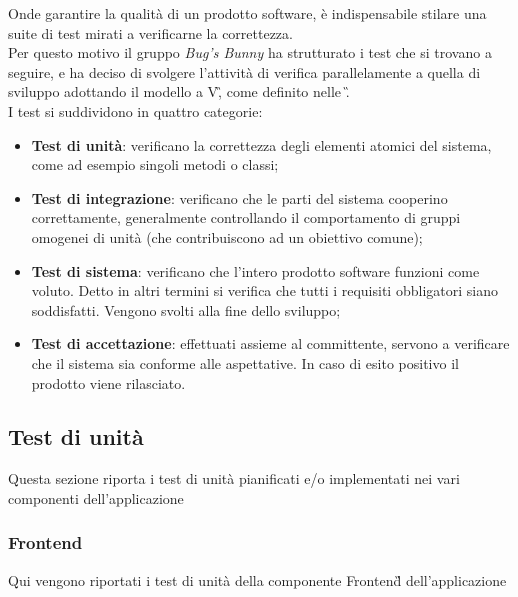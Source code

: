 
Onde garantire la qualità di un prodotto software, è indispensabile stilare una suite di test
mirati a verificarne la correttezza. \\
Per questo motivo il gruppo \textit{Bug's Bunny} ha strutturato i test che si trovano a seguire, e ha deciso 
di svolgere l'attività di verifica parallelamente a quella di sviluppo adottando il modello a V\G, 
come definito nelle \NdP\G. \\
I test si suddividono in quattro categorie:

\begin{itemize}
	\item \textbf{Test di unità}:  verificano la correttezza degli elementi atomici del sistema, come ad esempio singoli metodi o classi;
	\item \textbf{Test di integrazione}: verificano che le parti del sistema cooperino correttamente, generalmente controllando il comportamento di gruppi omogenei di unità (che contribuiscono ad un obiettivo comune);
	\item \textbf{Test di sistema}: verificano che l'intero prodotto software funzioni come voluto. Detto in altri termini si verifica che tutti i requisiti obbligatori siano soddisfatti. Vengono svolti alla fine dello sviluppo;
	\item \textbf{Test di accettazione}: effettuati assieme al committente, servono a verificare che il sistema sia conforme alle aspettative. In caso di esito positivo il prodotto viene rilasciato.
\end{itemize}


\subsection{Test di unità}
Questa sezione riporta i test di unità pianificati e/o implementati nei vari componenti dell'applicazione

    \subsubsection{Frontend}
    Qui vengono riportati i test di unità della componente Frontend\G{} dell'applicazione

